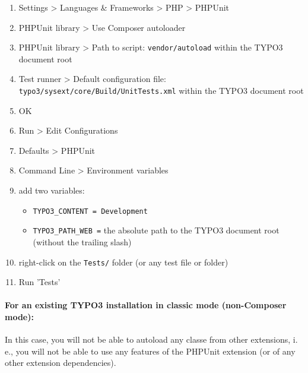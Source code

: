 \documentclass[a4paper,10pt,headsepline]{scrartcl}
\begin{document}
\begin{enumerate}
  \item Settings > Languages \& Frameworks > PHP > PHPUnit
  \item PHPUnit library > Use Composer autoloader
  \item PHPUnit library > Path to script: \texttt{vendor/autoload} within the TYPO3 document root
  \item Test runner > Default configuration file: \texttt{typo3/sysext/core/Build/UnitTests.xml} within the TYPO3 document root
  \item OK
  \item Run > Edit Configurations
  \item Defaults > PHPUnit
  \item Command Line > Environment variables
  \item add two variables:
    \begin{itemize}
      \item \texttt{TYPO3\_CONTENT = Development}
      \item \texttt{TYPO3\_PATH\_WEB =} the absolute path to the TYPO3 document root (without the trailing slash)
    \end{itemize}
  \item right-click on the \texttt{Tests/} folder (or any test file or folder)
  \item Run 'Tests'
\end{enumerate}


\paragraph{For an existing TYPO3 installation in classic mode (non-Composer mode):}

In this case, you will not be able to autoload any classe from other extensions, i.\,e., you will not be able to use any features of the PHPUnit extension (or of any other extension dependencies).
\end{document}
